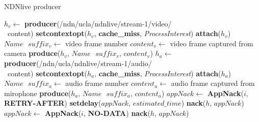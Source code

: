 \begin{algorithm}[ht]
\caption{NDNlive producer}
\label{alg:liveproducer}
\begin{algorithmic}[1]
\State $h_v \leftarrow $ \textbf{producer}(/ndn/ucla/ndnlive/stream-1/video/ \\\ content)
\State \textbf{setcontextopt}($h_v$, \textbf{cache\_miss}, \textit{ProcessInterest})
\State \textbf{attach}($h_v$)
\vspace{0.2cm}
	\State $Name \textbf{ } suffix_v \leftarrow $ video frame number
	\State $content_v \leftarrow $ video frame captured from camera
	\State \textbf{produce}($h_v$, $Name\textbf{ }suffix_v$, $content_v$)
	\EndWhile
\vspace{0.2cm}
\vspace{0.2cm}
\State $h_a \leftarrow $ \textbf{producer}(/ndn/ucla/ndnlive/stream-1/audio/ \\\  content)
\State \textbf{setcontextopt}($h_a$, \textbf{cache\_miss}, \textit{ProcessInterest})
\State \textbf{attach}($h_a$)
\vspace{0.2cm}
	\State $Name \textbf{ } suffix_a \leftarrow $ audio frame number
	\State $content_a \leftarrow $ audio frame captured from mirophone
	\State \textbf{produce}($h_a$, $Name\textbf{ }suffix_a$, $content_a$)
	\EndWhile
\vspace{0.4cm}
    \State $appNack \leftarrow $ \textbf{AppNack}($i$, \textbf{RETRY-AFTER})
    \State \textbf{setdelay}($appNack$, $estimated\_time$)
    \State \textbf{nack}($h$, $appNack$)
  \EndIf
    \State $appNack \leftarrow $ \textbf{AppNack}($i$, \textbf{NO-DATA})
    \State \textbf{nack}($h$, $appNack$)
  \EndIf
\EndFunction
\end{algorithmic}
\end{algorithm}

